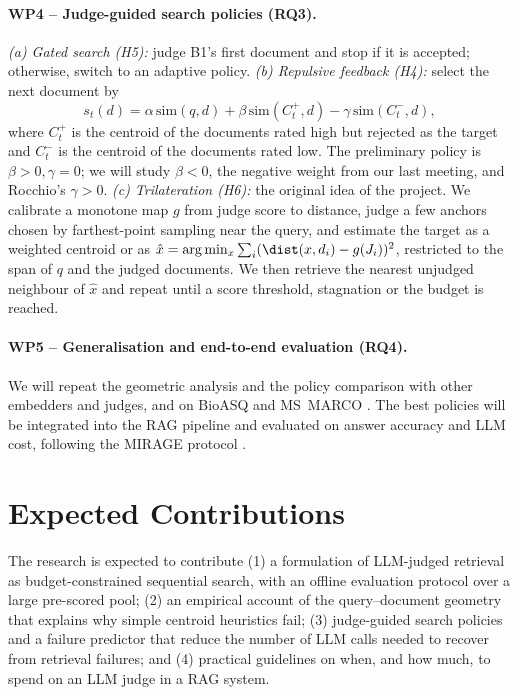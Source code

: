 \paragraph{WP4 -- Judge-guided search policies (RQ3).}
\emph{(a) Gated search (H5):} judge B1's first document and stop if it is accepted; otherwise, switch to an adaptive policy. \emph{(b) Repulsive feedback (H4):} select the next document by
\begin{equation}
  s_t(d)=\alpha\,\mathrm{sim}(q,d)+\beta\,\mathrm{sim}(C_t^{+},d)-\gamma\,\mathrm{sim}(C_t^{-},d),
\end{equation}
where $C_t^{+}$ is the centroid of the documents rated high but rejected as the target and $C_t^{-}$ is the centroid of the documents rated low. The preliminary policy is $\beta>0,\gamma=0$; we will study $\beta<0$, the negative weight from our last meeting, and Rocchio's $\gamma>0$. \emph{(c) Trilateration (H6):} the original idea of the project. We calibrate a monotone map $g$ from judge score to distance, judge a few anchors chosen by farthest-point sampling near the query, and estimate the target as a weighted centroid or as $\hat x=\arg\min_{x}\sum_i(\dist(x,d_i)-g(J_i))^2$, restricted to the span of $q$ and the judged documents. We then retrieve the nearest unjudged neighbour of $\hat x$ and repeat until a score threshold, stagnation or the budget is reached.

\paragraph{WP5 -- Generalisation and end-to-end evaluation (RQ4).}
We will repeat the geometric analysis and the policy comparison with other embedders \citep{jin2023medcpt} and judges, and on BioASQ \citep{tsatsaronis2015bioasq} and MS~MARCO \citep{nguyen2016msmarco}. The best policies will be integrated into the RAG pipeline and evaluated on answer accuracy and LLM cost, following the MIRAGE protocol \citep{xiong2024medrag}.

\section{Expected Contributions}

The research is expected to contribute (1) a formulation of LLM-judged retrieval as budget-constrained sequential search, with an offline evaluation protocol over a large pre-scored pool; (2) an empirical account of the query--document geometry that explains why simple centroid heuristics fail; (3) judge-guided search policies and a failure predictor that reduce the number of LLM calls needed to recover from retrieval failures; and (4) practical guidelines on when, and how much, to spend on an LLM judge in a RAG system.


